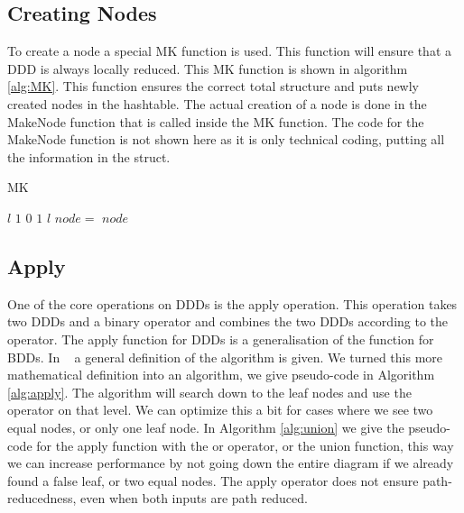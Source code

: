 \subsection{Creating Nodes}
To create a node a special MK function is used. This function will ensure that a DDD is always locally reduced. This MK function is shown in algorithm \ref{alg:MK}. This function ensures the correct total structure and puts newly created nodes in the hashtable. The actual creation of a node is done in the MakeNode function that is called inside the MK function. The code for the MakeNode function is not shown here as it is only technical coding, putting all the information in the struct.
\begin{algorithm}
\caption{MK}\label{alg:MK}
\begin{algorithmic}[1]
		\State \Return $l$
	\EndIf
		\State \Return $1$
	\EndIf
		\State \Return $0$
	\EndIf
		\State \Return $1$
	\EndIf
		\State \Return $l$
	\EndIf
	\State $node =$ 
		\State {}
	\EndIf
	\State \Return $node$
\EndProcedure	
\end{algorithmic}
\end{algorithm}


\subsection{Apply}
One of the core operations on DDDs is the apply operation. This operation takes two DDDs and a binary operator and combines the two DDDs according to the operator. The apply function for DDDs is a generalisation of the function for BDDs. In ~\cite{ddds} a general definition of the algorithm is given. We turned this more mathematical definition into an algorithm, we give pseudo-code in Algorithm \ref{alg:apply}. The algorithm will search down to the leaf nodes and use the operator on that level. We can optimize this a bit for cases where we see two equal nodes, or only one leaf node. In Algorithm \ref{alg:union} we give the pseudo-code for the apply function with the or operator, or the union function, this way we can increase performance by not going down the entire diagram if we already found a false leaf, or two equal nodes. The apply operator does not ensure path-reducedness, even when both inputs are path reduced. 

